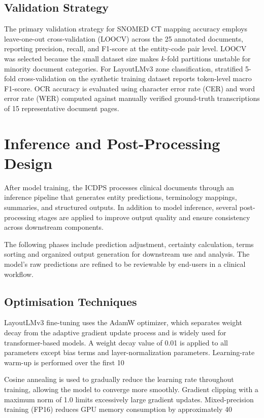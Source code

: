 \subsection{Validation Strategy}
The primary validation strategy for SNOMED CT mapping accuracy employs leave-one-out cross-validation (LOOCV) across the 25 annotated documents, reporting precision, recall, and F1-score at the entity-code pair level. LOOCV was selected because the small dataset size makes $k$-fold partitions unstable for minority document categories. For LayoutLMv3 zone classification, stratified 5-fold cross-validation on the synthetic training dataset reports token-level macro F1-score. OCR accuracy is evaluated using character error rate (CER) and word error rate (WER) computed against manually verified ground-truth transcriptions of 15 representative document pages.

\section{Inference and Post-Processing Design}

After model training, the ICDPS processes clinical documents through an inference pipeline that generates entity predictions, terminology mappings, summaries, and structured outputs. In addition to model inference, several post-processing stages are applied to improve output quality and ensure consistency across downstream components.

The following phases include prediction adjustment, certainty calculation, terms sorting and organized output generation for downstream use and analysis. The model's raw predictions are refined to be reviewable by end-users in a clinical workflow.

\subsection{Optimisation Techniques}

LayoutLMv3 fine-tuning uses the AdamW optimizer, which separates weight decay from the adaptive gradient update process and is widely used for transformer-based models. A weight decay value of 0.01 is applied to all parameters except bias terms and layer-normalization parameters. Learning-rate warm-up is performed over the first 10%

Cosine annealing is used to gradually reduce the learning rate throughout training, allowing the model to converge more smoothly. Gradient clipping with a maximum norm of 1.0 limits excessively large gradient updates. Mixed-precision training (FP16) reduces GPU memory consumption by approximately 40%

